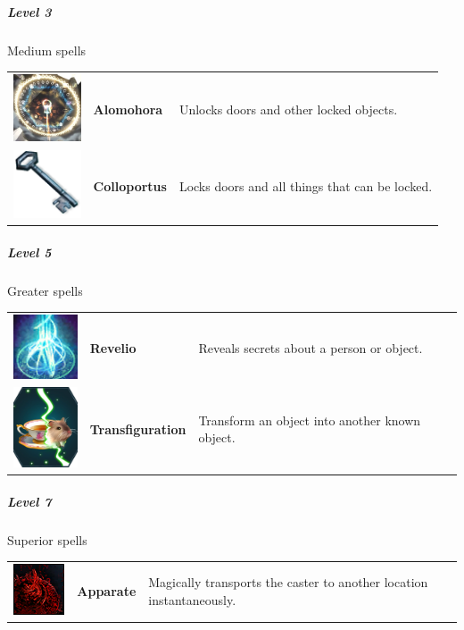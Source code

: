 \subparagraph{Level 3} 
Medium  spells\\
\begin{tabular}{ m{2cm}m{3cm}m{8cm} } 
	\includegraphics[width=2cm]{../Pictures/Gameplay/Spells/Icon/Alomohora_spell_icon.png} & \textbf{Alomohora} & Unlocks doors and other locked objects. \\ 
   \includegraphics[width=2cm]{../Pictures/Gameplay/Spells/Icon/Colloportus_spell_icon.png} & \textbf{Colloportus} &  Locks doors and all things that can be locked. \\ 
\end{tabular}
	

\subparagraph{Level 5} 
Greater spells\\
\begin{tabular}{ m{2cm}m{3cm}m{8cm} } 
	\includegraphics[width=2cm]{../Pictures/Gameplay/Spells/Icon/Revelio_spell_icon.png} & \textbf{Revelio} & Reveals secrets about a person or object.  \\ 
	\includegraphics[width=2cm]{../Pictures/Gameplay/Spells/Icon/Transfiguration_spell_icon.png} & \textbf{Transfiguration} &Transform an object into another known object.\\ 
\end{tabular}


\subparagraph{Level 7} 
Superior  spells\\
\begin{tabular}{ m{2cm}m{3cm}m{8cm} } 
	\includegraphics[width=2cm]{../Pictures/Gameplay/Spells/Icon/Apparate_spell_icon.png} & \textbf{Apparate} & Magically transports the caster to another location instantaneously.  \\ 
\end{tabular}

